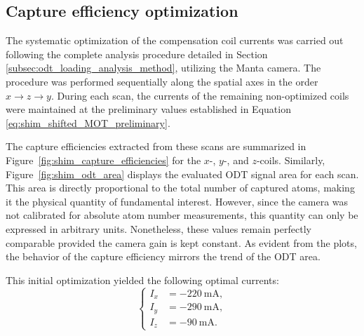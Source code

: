 \subsection{Capture efficiency optimization}

The systematic optimization of the compensation coil currents was carried out following the complete analysis procedure detailed in Section \ref{subsec:odt_loading_analysis_method}, utilizing the Manta camera. The procedure was performed sequentially along the spatial axes in the order $x \rightarrow z \rightarrow y$. During each scan, the currents of the remaining non-optimized coils were maintained at the preliminary values established in Equation \eqref{eq:shim_shifted_MOT_preliminary}.

The capture efficiencies extracted from these scans are summarized in Figure~\ref{fig:shim_capture_efficiencies} for the $x$-, $y$-, and $z$-coils. Similarly, Figure~\ref{fig:shim_odt_area} displays the evaluated ODT signal area for each scan. This area is directly proportional to the total number of captured atoms, making it the physical quantity of fundamental interest. However, since the camera was not calibrated for absolute atom number measurements, this quantity can only be expressed in arbitrary units. Nonetheless, these values remain perfectly comparable provided the camera gain is kept constant. As evident from the plots, the behavior of the capture efficiency mirrors the trend of the ODT area.

This initial optimization yielded the following optimal currents:
\begin{equation}
    \begin{cases}
        I_{x} &= -220~\mathrm{mA}, \\
        I_{y} &= -290~\mathrm{mA}, \\
        I_{z} &= -90~\mathrm{mA}.
    \end{cases}
\end{equation}

